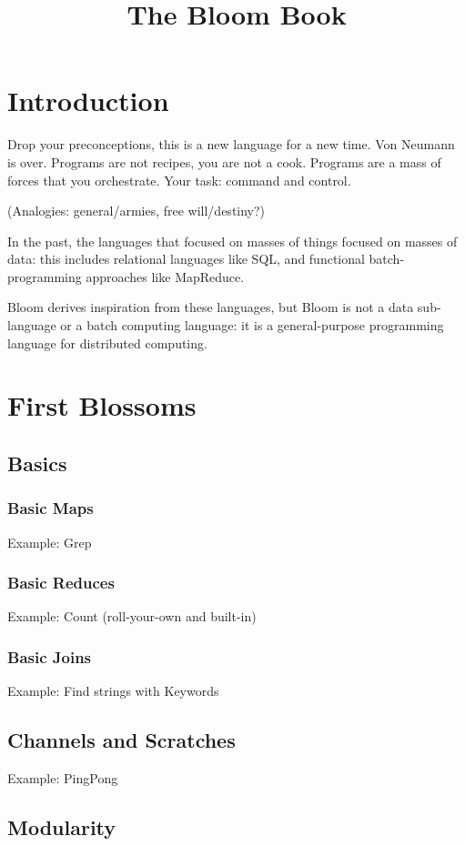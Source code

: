 \documentclass[]{book}
\title{The Bloom Book}
\begin{document}
\maketitle
\chapter{Introduction}
Drop your preconceptions, this is a new language for a new time.  Von Neumann is over.  Programs are not recipes, you are not a cook.  Programs are a mass of forces that you orchestrate.  Your task: command and control.

(Analogies: general/armies, free will/destiny?)

In the past, the languages that focused on masses of things focused on masses of data: this includes relational languages like SQL, and functional batch-programming approaches like MapReduce.

Bloom derives inspiration from these languages, but Bloom is not a data sub-language or a batch computing language: it is a general-purpose programming language for distributed computing.

\chapter{First Blossoms}
    \section{Basics}
        \subsection{Basic Maps}
        Example: Grep
        \subsection{Basic Reduces}
        Example: Count (roll-your-own and built-in)
        \subsection{Basic Joins}
        Example: Find strings with Keywords
    \section{Channels and Scratches}
    Example: PingPong
    \section{Modularity}
\end{document}
